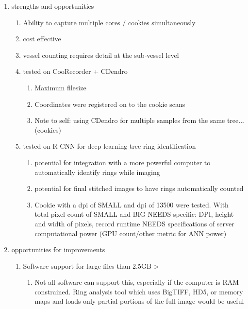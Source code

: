 \documentclass{article}
\begin{document}
\begin{outline}[enumerate]
\begin{enumerate}
\begin{enumerate}
		\end{enumerate}
	\item strengths and opportunities
		\begin{enumerate} %
		\item Ability to capture multiple cores / cookies simultaneously
		\item cost effective
		\item vessel counting requires detail at the sub-vessel level %
		\item tested on CooRecorder + CDendro
			\begin{enumerate}
			\item Maximum filesize 
			\item Coordinates were registered on to the cookie scans 
			\item Note to self: using CDendro for multiple samples from the same tree... (cookies) 
			\end{enumerate}
		\item tested on R-CNN for deep learning tree ring identification
			\begin{enumerate}
			\item potential for integration with a more powerful computer to automatically identify rings while imaging
			\item potential for final stitched images to have rings automatically counted
			\item Cookie with a dpi of SMALL and dpi of 13500 were tested. With total pixel count of SMALL and BIG
				\subitem NEEDS specific: DPI, height and width of pixels, record runtime
				\subitem NEEDS specifications of server computational power (GPU count/other metric for ANN power)
			\end{enumerate}
		\end{enumerate}
	\item opportunities for improvements %
		\begin{enumerate}
		\item Software support for large files than 2.5GB >
			\begin{enumerate}
			\item Not all software can support this, especially if the computer is RAM constrained. Ring analysis tool which uses BigTIFF, HD5, or memory maps and loads only partial portions of the full image would be useful

\end{enumerate}
\end{enumerate}
\end{enumerate}
\end{outline}
\end{document}
